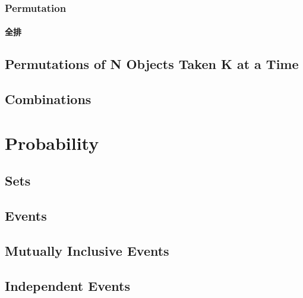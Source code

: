 \documentclass[
	11pt, %
	handout,
]{beamer}
\begin{document}

\begin{frame}
	\frametitle{Permutation} %
	\framesubtitle{全排}

\end{frame}


\subsection{Permutations of N Objects Taken K at a Time}


\subsection{Combinations}



\section{Probability}


\subsection{Sets}


\subsection{Events}


\subsection{Mutually Inclusive Events}


\subsection{Independent Events}
\end{document}
